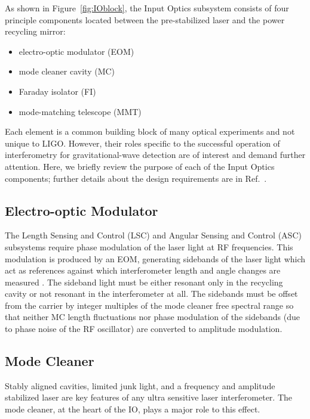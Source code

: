 As shown in Figure~\ref{fig:IOblock}, the Input Optics subsystem
consists of four principle components located between the
pre-stabilized laser and the power recycling mirror:
\begin{itemize}
\item electro-optic modulator (EOM) \vspace{-10 pt}
\item mode cleaner cavity (MC) \vspace{-10 pt}
\item Faraday isolator (FI) \vspace{-10 pt}
\item mode-matching telescope (MMT)
\end{itemize}
Each element is a common building block of many optical experiments
and not unique to LIGO. However, their roles specific to the
successful operation of interferometry for gravitational-wave
detection are of interest and demand further attention. Here, we
briefly review the purpose of each of the Input Optics components;
further details about the design requirements are in
Ref.~\citep{Camp1997Input}.




\subsection{Electro-optic Modulator} 
The Length Sensing and Control (LSC) and Angular Sensing and Control
(ASC) subsystems require phase modulation of the laser light at RF
frequencies. This modulation is produced by an EOM, generating
sidebands of the laser light which act as references against which
interferometer length and angle changes are measured
\citep{Fritschel2001Readout}. The sideband light must be either
resonant only in the recycling cavity or not resonant in the
interferometer at all. The sidebands must be offset from the carrier
by integer multiples of the mode cleaner free spectral range so that
neither MC length fluctuations nor phase modulation of the sidebands
(due to phase noise of the RF oscillator) are converted to amplitude modulation.


\subsection{Mode Cleaner}
Stably aligned cavities, limited junk light, and a frequency and
amplitude stabilized laser are key features of any ultra sensitive
laser interferometer. The mode cleaner, at the heart of the IO, plays
a major role to this effect.

